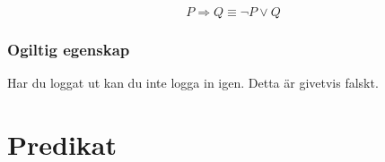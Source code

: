\documentclass{article}
\begin{document}
  $$
  P \Rightarrow Q \equiv \neg P \lor Q
  $$

  \begin{figure}[h!]
    
  \end{figure}


  \subsubsection{Ogiltig egenskap}
  Har du loggat ut kan du inte logga in igen. Detta är givetvis falskt.

  \begin{figure}[h!]
    
  \end{figure}

  \newpage

  \section{Predikat}
\end{document}
